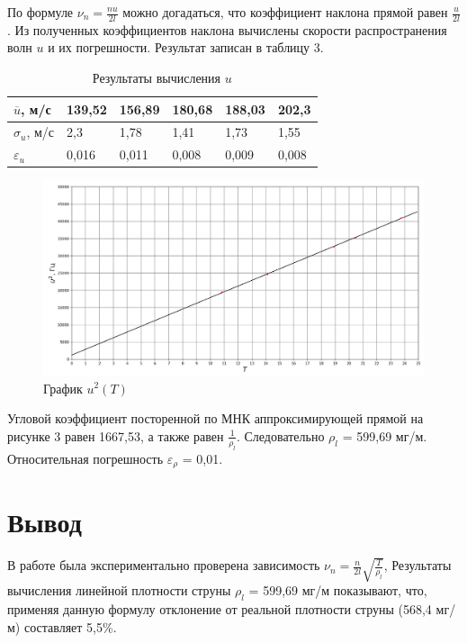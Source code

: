 \documentclass[a4paper,12pt]{article}
\begin{document}
\pagebreak

По формуле $\nu_{n} = \frac{nu}{2l}$ можно догадаться, что коэффициент наклона прямой равен $\frac{u}{2l}$. Из полученных коэффициентов наклона вычислены скорости распространения волн $u$ и их погрешности. Результат записан в таблицу 3.

\begin{table}[!ht]
    \centering
    \caption{Результаты вычисления $u$}
    \begin{tabular}{|l|l|l|l|l|l|}
    \hline
        $\overline{u}$, м/с & 139,52 & 156,89 & 180,68 & 188,03 & 202,3 \\ \hline
        $\sigma_u$, м/с & 2,3 & 1,78 & 1,41 & 1,73 & 1,55 \\ \hline
        $\varepsilon_u$ & 0,016 & 0,011 & 0,008 & 0,009 & 0,008 \\ \hline
    \end{tabular}
\end{table}

\begin{figure}[h]
    \centering
    \includegraphics[scale=0.45]{Screenshot 2023-10-11 140253.png}
    \caption{График $u^2(T)$}
    \label{fig:enter-label}
\end{figure}

Угловой коэффициент посторенной по МНК аппроксимирующей прямой на рисунке 3 равен 1667,53, а также равен $\frac{1}{\rho_l}$. Следовательно $\rho_l$ = 599,69 мг/м. Относительная погрешность $\varepsilon_\rho$ = 0,01.

\section{Вывод}
В работе была экспериментально проверена зависимость $\nu_{n} = \frac{n}{2l}\sqrt{\frac{T}{\rho_l}}$, Результаты вычисления линейной плотности струны $\rho_l$ = 599,69 мг/м показывают, что, применяя данную формулу отклонение от реальной плотности струны (568,4 мг/м) составляет 5,5\%. 
\end{document}
